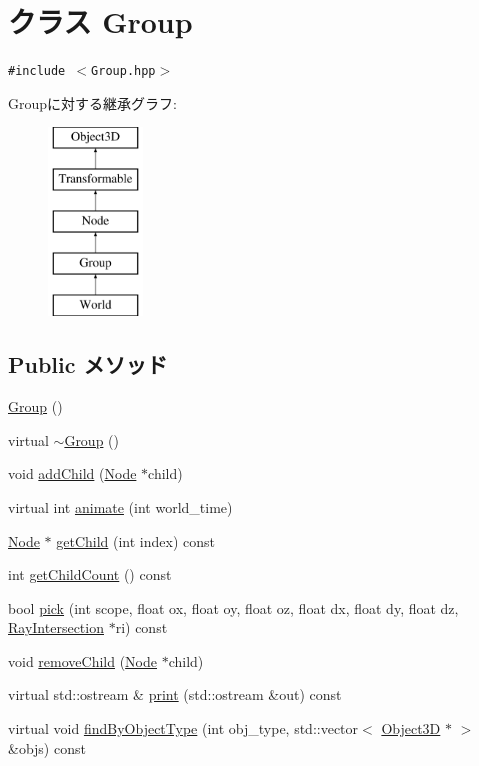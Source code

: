 \hypertarget{classm3g_1_1Group}{
\section{クラス Group}
\label{classm3g_1_1Group}
}
{\tt \#include $<$Group.hpp$>$}

Groupに対する継承グラフ:\begin{figure}[H]
\begin{center}
\leavevmode
\includegraphics[height=5cm]{classm3g_1_1Group}
\end{center}
\end{figure}
\subsection*{Public メソッド}
\begin{CompactItemize}
\item 
\hyperlink{classm3g_1_1Group_0b29b9393b4b6856ac75b759f4166c13}{Group} ()
\item 
virtual \hyperlink{classm3g_1_1Group_a2a755272411c0d861f46f30970f5ca5}{$\sim$Group} ()
\item 
void \hyperlink{classm3g_1_1Group_f7c798f6f7924dc14403df261f82153a}{addChild} (\hyperlink{classm3g_1_1Node}{Node} $\ast$child)
\item 
virtual int \hyperlink{classm3g_1_1Group_8aad1ceab4c2a03609c8a42324ce484d}{animate} (int world\_\-time)
\item 
\hyperlink{classm3g_1_1Node}{Node} $\ast$ \hyperlink{classm3g_1_1Group_a3af7d07fde341ef751157d274538698}{getChild} (int index) const 
\item 
int \hyperlink{classm3g_1_1Group_756d01dca16e146d69bb1881aca8fbb7}{getChildCount} () const 
\item 
bool \hyperlink{classm3g_1_1Group_10a3c77fa36fdb5d09b2bf39fe2a7c0b}{pick} (int scope, float ox, float oy, float oz, float dx, float dy, float dz, \hyperlink{classm3g_1_1RayIntersection}{RayIntersection} $\ast$ri) const 
\item 
void \hyperlink{classm3g_1_1Group_7415646c6f397f080d198176df44395c}{removeChild} (\hyperlink{classm3g_1_1Node}{Node} $\ast$child)
\item 
virtual std::ostream \& \hyperlink{classm3g_1_1Group_6fea17fa1532df3794f8cb39cb4f911f}{print} (std::ostream \&out) const 
\item 
virtual void \hyperlink{classm3g_1_1Group_4dadb21b568b0230fac106f15040138c}{findByObjectType} (int obj\_\-type, std::vector$<$ \hyperlink{classm3g_1_1Object3D}{Object3D} $\ast$ $>$ \&objs) const 
\end{CompactItemize}
